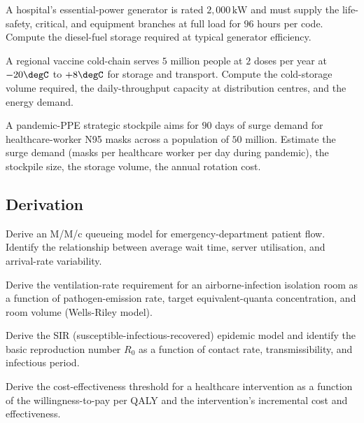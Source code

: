\begin{exercise}
A hospital's essential-power generator is rated $2{,}000\,\text{kW}$ and must supply the life-safety, critical, and equipment branches at full load for $96$ hours per code. Compute the diesel-fuel storage required at typical generator efficiency.
\end{exercise}

\begin{exercise}
A regional vaccine cold-chain serves $5$ million people at $2$ doses per year at $-20\degC$ to $+8\degC$ for storage and transport. Compute the cold-storage volume required, the daily-throughput capacity at distribution centres, and the energy demand.
\end{exercise}

\begin{exercise}
A pandemic-PPE strategic stockpile aims for $90$ days of surge demand for healthcare-worker N95 masks across a population of $50$ million. Estimate the surge demand (masks per healthcare worker per day during pandemic), the stockpile size, the storage volume, the annual rotation cost.
\end{exercise}

\subsection*{Derivation}

\begin{exercise}
Derive an M/M/c queueing model for emergency-department patient flow. Identify the relationship between average wait time, server utilisation, and arrival-rate variability.
\end{exercise}

\begin{exercise}
Derive the ventilation-rate requirement for an airborne-infection isolation room as a function of pathogen-emission rate, target equivalent-quanta concentration, and room volume (Wells-Riley model).
\end{exercise}

\begin{exercise}
Derive the SIR (susceptible-infectious-recovered) epidemic model and identify the basic reproduction number $R_0$ as a function of contact rate, transmissibility, and infectious period.
\end{exercise}

\begin{exercise}
Derive the cost-effectiveness threshold for a healthcare intervention as a function of the willingness-to-pay per QALY and the intervention's incremental cost and effectiveness.
\end{exercise}

